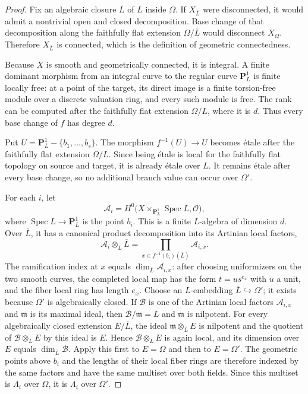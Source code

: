 \documentclass[11pt]{amsart}
\theoremstyle{plain}
\theoremstyle{definition}
\numberwithin{equation}{section}
\begin{document}
\begin{proof}
Fix an algebraic closure $\overline L$ of $L$ inside $\Omega$.  If
$X_{\overline L}$ were disconnected, it would admit a nontrivial open and
closed decomposition.  Base change of that decomposition along the
faithfully flat extension $\Omega/\overline L$ would disconnect
$X_\Omega$.  Therefore $X_{\overline L}$ is connected, which is the
definition of geometric connectedness.

Because $X$ is smooth and geometrically connected, it is integral.  A
finite dominant morphism from an integral curve to the regular curve
$\mathbf P^1_L$ is finite locally free: at a point of the target, its
direct image is a finite torsion-free module over a discrete valuation
ring, and every such module is free.  The rank can be computed after the
faithfully flat extension $\Omega/L$, where it is $d$.  Thus every base
change of $f$ has degree $d$.

Put $U=\mathbf P^1_L-\{b_1,\ldots,b_s\}$.  The morphism
$f^{-1}(U)\to U$ becomes \'etale after the faithfully flat extension
$\Omega/L$.  Since being \'etale is local for the faithfully flat topology
on source and target, it is already \'etale over $L$.  It remains \'etale
after every base change, so no additional branch value can occur over
$\Omega'$.

For each $i$, let
\[
 \mathcal A_i=H^0\bigl(X\times_{\mathbf P^1_L}\operatorname{Spec}L,
              \mathcal O\bigr),
\]
where $\operatorname{Spec}L\to\mathbf P^1_L$ is the point $b_i$.  This is
a finite $L$-algebra of dimension $d$.  Over $\overline L$, it has a
canonical product decomposition into its Artinian local factors,
\[
 \mathcal A_i\otimes_L\overline L
 =\prod_{x\in f^{-1}(b_i)(\overline L)}\mathcal A_{i,x}.
\]
The ramification index at $x$ equals
$\dim_{\overline L}\mathcal A_{i,x}$: after choosing uniformizers on the two smooth
curves, the completed local map has the form
$t=u s^{e_x}$ with $u$ a unit, and the fiber local ring has length $e_x$.
Choose an $L$-embedding $\overline L\hookrightarrow\Omega'$; it exists
because $\Omega'$ is algebraically closed.  If $\mathcal B$ is one of the
Artinian local factors $\mathcal A_{i,x}$ and $\mathfrak m$ is its maximal
ideal, then $\mathcal B/\mathfrak m=\overline L$ and $\mathfrak m$ is
nilpotent.  For every algebraically closed extension $E/\overline L$, the
ideal $\mathfrak m\otimes_{\overline L}E$ is nilpotent and the quotient of
$\mathcal B\otimes_{\overline L}E$ by this ideal is $E$.  Hence
$\mathcal B\otimes_{\overline L}E$ is again local, and its dimension over
$E$ equals $\dim_{\overline L}\mathcal B$.  Apply this first to
$E=\Omega$ and then to $E=\Omega'$.  The geometric points above $b_i$ and
the lengths of their local fiber rings are therefore indexed by the same
factors and have the same multiset over both fields.  Since this multiset is
$\Lambda_i$ over $\Omega$, it is $\Lambda_i$ over $\Omega'$.
\end{proof}
\end{document}
